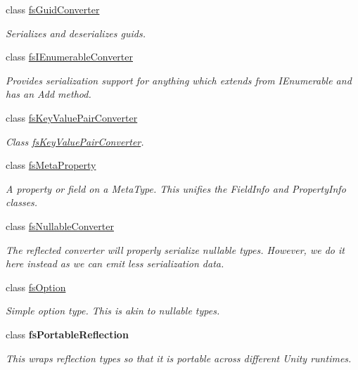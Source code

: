 \begin{DoxyCompactItemize}
class \hyperlink{class_full_serializer_1_1_internal_1_1fs_guid_converter}{fs\+Guid\+Converter}
\begin{DoxyCompactList}\small\item\em Serializes and deserializes guids. \end{DoxyCompactList}\item 
class \hyperlink{class_full_serializer_1_1_internal_1_1fs_i_enumerable_converter}{fs\+I\+Enumerable\+Converter}
\begin{DoxyCompactList}\small\item\em Provides serialization support for anything which extends from {\ttfamily I\+Enumerable} and has an {\ttfamily Add} method. \end{DoxyCompactList}\item 
class \hyperlink{class_full_serializer_1_1_internal_1_1fs_key_value_pair_converter}{fs\+Key\+Value\+Pair\+Converter}
\begin{DoxyCompactList}\small\item\em Class \hyperlink{class_full_serializer_1_1_internal_1_1fs_key_value_pair_converter}{fs\+Key\+Value\+Pair\+Converter}. \end{DoxyCompactList}\item 
class \hyperlink{class_full_serializer_1_1_internal_1_1fs_meta_property}{fs\+Meta\+Property}
\begin{DoxyCompactList}\small\item\em A property or field on a Meta\+Type. This unifies the Field\+Info and Property\+Info classes. \end{DoxyCompactList}\item 
class \hyperlink{class_full_serializer_1_1_internal_1_1fs_nullable_converter}{fs\+Nullable\+Converter}
\begin{DoxyCompactList}\small\item\em The reflected converter will properly serialize nullable types. However, we do it here instead as we can emit less serialization data. \end{DoxyCompactList}\item 
class \hyperlink{struct_full_serializer_1_1_internal_1_1fs_option}{fs\+Option}
\begin{DoxyCompactList}\small\item\em Simple option type. This is akin to nullable types. \end{DoxyCompactList}\item 
class {\bfseries fs\+Portable\+Reflection}
\begin{DoxyCompactList}\small\item\em This wraps reflection types so that it is portable across different Unity runtimes. \end{DoxyCompactList}\item 

\end{DoxyCompactItemize}
